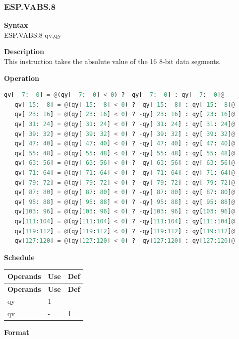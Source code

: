 \newpage
\subsubsection{ESP.VABS.8}\label{instruction:ESPVABS8}
\textbf{Syntax}\\
ESP.VABS.8 qv,qy

\textbf{Description}\\
This instruction takes the absolute value of the 16 8-bit data segments.

\textbf{Operation}\\
\begin{lstlisting}[language=Python, escapechar=@]
   qv[  7:  0] = @(qy[  7:  0] < 0) ? -qy[  7:  0] : qy[  7:  0]@
   qv[ 15:  8] = @(qy[ 15:  8] < 0) ? -qy[ 15:  8] : qy[ 15:  8]@
   qv[ 23: 16] = @(qy[ 23: 16] < 0) ? -qy[ 23: 16] : qy[ 23: 16]@
   qv[ 31: 24] = @(qy[ 31: 24] < 0) ? -qy[ 31: 24] : qy[ 31: 24]@
   qv[ 39: 32] = @(qy[ 39: 32] < 0) ? -qy[ 39: 32] : qy[ 39: 32]@
   qv[ 47: 40] = @(qy[ 47: 40] < 0) ? -qy[ 47: 40] : qy[ 47: 40]@
   qv[ 55: 48] = @(qy[ 55: 48] < 0) ? -qy[ 55: 48] : qy[ 55: 48]@
   qv[ 63: 56] = @(qy[ 63: 56] < 0) ? -qy[ 63: 56] : qy[ 63: 56]@
   qv[ 71: 64] = @(qy[ 71: 64] < 0) ? -qy[ 71: 64] : qy[ 71: 64]@
   qv[ 79: 72] = @(qy[ 79: 72] < 0) ? -qy[ 79: 72] : qy[ 79: 72]@
   qv[ 87: 80] = @(qy[ 87: 80] < 0) ? -qy[ 87: 80] : qy[ 87: 80]@
   qv[ 95: 88] = @(qy[ 95: 88] < 0) ? -qy[ 95: 88] : qy[ 95: 88]@
   qv[103: 96] = @(qy[103: 96] < 0) ? -qy[103: 96] : qy[103: 96]@
   qv[111:104] = @(qy[111:104] < 0) ? -qy[111:104] : qy[111:104]@
   qv[119:112] = @(qy[119:112] < 0) ? -qy[119:112] : qy[119:112]@
   qv[127:120] = @(qy[127:120] < 0) ? -qy[127:120] : qy[127:120]@
\end{lstlisting}


\textbf{Schedule}\\
\begin{longtable}[c]{|l|l|l|}
    \hline
    \rowcolor{lightgray}
    \textbf{Operands} & \textbf{Use} & \textbf{Def} \\\hline
    \endfirsthead
    \hline
    \rowcolor{lightgray}
     \textbf{Operands} & \textbf{Use} & \textbf{Def} \\\hline
    \endhead
    \hline
    \endfoot

    qy & 1 & - \\\hline
     qv & - & 1

\end{longtable}

\textbf{Format}\\


